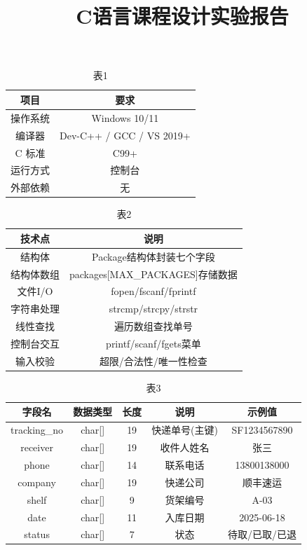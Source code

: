 \documentclass[withoutpreface,bwprint]{cumcmthesis}
\title{C语言课程设计实验报告}
\begin{document}
\maketitle



\newpage
\appendix

\begin{table}[H]
  \centering
  \caption{表1}
  \label{tab:1}
  \begin{tabular}{|c|c|}
    \hline
    项目 & 要求 \\ \hline
    操作系统 & Windows 10/11 \\ \hline
    编译器 & Dev-C++ / GCC / VS 2019+ \\ \hline
    C 标准 & C99+ \\ \hline
    运行方式 & 控制台 \\ \hline
    外部依赖 & 无 \\ \hline
  \end{tabular}
\end{table}

\begin{table}[H]
  \centering
  \caption{表2}
  \label{tab:2}
  \begin{tabular}{|c|c|}
    \hline
    技术点 & 说明 \\ \hline
    结构体 & Package结构体封装七个字段 \\ \hline
    结构体数组 & packages[MAX\_PACKAGES]存储数据 \\ \hline
    文件I/O & fopen/fscanf/fprintf \\ \hline
    字符串处理 & strcmp/strcpy/strstr \\ \hline
    线性查找 & 遍历数组查找单号 \\ \hline
    控制台交互 & printf/scanf/fgets菜单 \\ \hline
    输入校验 & 超限/合法性/唯一性检查 \\ \hline
  \end{tabular}
\end{table}

\begin{table}[H]
  \centering
  \caption{表3}
  \label{tab:3}
  \begin{tabular}{|c|c|c|c|c|}
    \hline
    字段名 & 数据类型 & 长度 & 说明 & 示例值 \\ \hline
    tracking\_no & char[] & 19 & 快递单号(主键) & SF1234567890 \\ \hline
    receiver & char[] & 19 & 收件人姓名 & 张三 \\ \hline
    phone & char[] & 14 & 联系电话 & 13800138000 \\ \hline
    company & char[] & 19 & 快递公司 & 顺丰速运 \\ \hline
    shelf & char[] & 9 & 货架编号 & A-03 \\ \hline
    date & char[] & 11 & 入库日期 & 2025-06-18 \\ \hline
    status & char[] & 7 & 状态 & 待取/已取/已退 \\ \hline
  \end{tabular}
\end{table}
\end{document}
